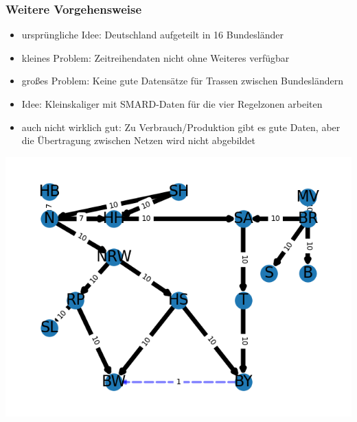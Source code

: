 \documentclass[aspectratio=169,t]{beamer}
\begin{document}
	\begin{frame}
		\frametitle{Weitere Vorgehensweise}
		\vspace*{0mm}
			\begin{minipage}{1\linewidth}
			\begin{minipage}{.5\linewidth}
				\begin{itemize}
					\item ursprüngliche Idee: Deutschland aufgeteilt in 16 Bundesländer
					\item kleines Problem: Zeitreihendaten nicht ohne Weiteres verfügbar
					\item großes Problem: Keine gute Datensätze für Trassen zwischen Bundesländern
					\item Idee: Kleinskaliger mit SMARD-Daten für die vier Regelzonen arbeiten
					\item auch nicht wirklich gut: Zu Verbrauch/Produktion gibt es gute Daten, aber die Übertragung zwischen Netzen wird nicht abgebildet
				\end{itemize}
			\end{minipage}
			\hfill
			\begin{minipage}{.5\linewidth}
				\centering
				\includegraphics[width=.8\linewidth]{Example_graph_2.png}
				
			\end{minipage}
		\end{minipage}	
	
			
	\end{frame}
	
\end{document}

